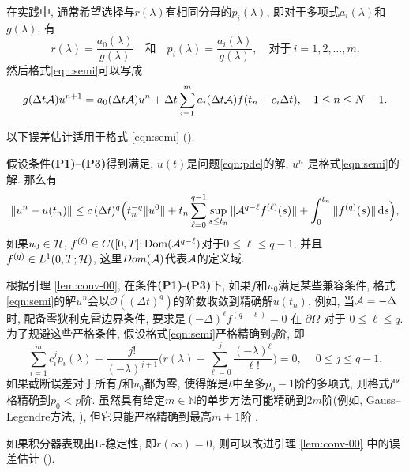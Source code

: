 在实践中, 通常希望选择与$r (\lambda)$有相同分母的$p_i(\lambda)$, 即对于多项式$a_i(\lambda)$和$g(\lambda)$, 有
\begin{equation*}
	r (\lambda) = \frac{a_0(\lambda)}{g(\lambda)}\quad \text{和} \quad p_i(\lambda) = \frac{a_i(\lambda)}{g(\lambda)}, \quad \text{对于}~i=1,2,\ldots,m.
\end{equation*}
然后格式\eqref{eqn:semi}可以写成
\begin{equation*}
	g({\Delta t} {\mathcal{A}}) u^{n+1} = a_0({\Delta t} {\mathcal{A}}) u^{n} + {\Delta t} \sum_{i=1}^m a_i({\Delta t} {\mathcal{A}}) f(t_n+c_i\Delta t) ,\quad 1 \le n\le N-1.
\end{equation*}

以下误差估计适用于格式 \eqref{eqn:semi} (\cite[定理7.2和8.1]{thomee2007galerkin}). 
\begin{lemma}\label{lem:conv-00}
	假设条件{\bf{(P1)}}--{\bf{(P3)}}得到满足, 
	$u(t)$是问题\eqref{eqn:pde}的解, $u^n$
	是格式\eqref{eqn:semi}的解. 那么有
	\begin{equation*}%
		\|u^n - u(t_n)\|\leq
		c\, (\Delta t)^q \Big( t_n^{-q} \| u^0 \|
		+ t_n \sum_{\ell=0}^{q-1} \sup_{s\le t_n} \| \A^{q-\ell}f^{(\ell)}(s)  \| + \int_0^{t_n}
		\| f^{(q)}(s) \|\,\d s\Big),
	\end{equation*}
	如果$u_0\in {\mathcal{H}}$, $f^{(\ell)}\in C([0,T];\mathrm{Dom}({\mathcal{A}}^{q-\ell})$对于$0\le \ell\le q-1$, 并且$f^{(q)} \in L^1(0,T; {\mathcal{H}})$, 这里$Dom({\mathcal{A}})$代表${\mathcal{A}}$的定义域.
\end{lemma}\medskip

 \begin{remark}\label{rem:conv-00}
	根据引理 \ref{lem:conv-00}, 在条件{\bf{(P1)}}-{\bf{(P3)}}下, 如果$f$和$u_0$满足某些兼容条件, 格式\eqref{eqn:semi}的解$u^n$会以$\mathcal{O}((\Delta t)^q)$的阶数收敛到精确解$u(t_n)$. 例如, 当\({\mathcal{A}} = -\Delta\)时, 配备零狄利克雷边界条件, 要求是\( (-\Delta)^{\ell} f^{(q-\ell)} = 0 \) 在 \(\partial\Omega\) 对于 \(0 \le \ell \le q\). 为了规避这些严格条件, 假设格式\eqref{eqn:semi}严格精确到$q$阶, 即
	\[
	\sum_{i=1}^m c_i^j p_i(\lambda) - \frac{j!}{(-\lambda)^{j+1}}\Big( r (\lambda)
	- \sum_{\ell=0}^j \frac{(-\lambda)^\ell}{\ell!}\Big) = 0, \quad ~0\le j\le q-1.
	\]
	如果截断误差对于所有$f$和$u_0$都为零, 使得解是$t$中至多$p_0-1$阶的多项式, 则格式严格精确到$p_0 < p$阶. 
	虽然具有给定$m \in \mathbb{N}$的单步方法可能精确到$2m$阶(例如, Gauss--Legendre方法, \cite[第2.2节]{ehle1969pade}), 但它只能严格精确到最高\(m+1\)阶 \cite[引理5]{brenner1982single}. 
\end{remark}\medskip

\begin{remark}\label{rem:conv-01}
	如果积分器表现出L-稳定性, 即$r(\infty) = 0$, 则可以改进引理 \ref{lem:conv-00} 中的误差估计 (\cite[定理7.2]{thomee2007galerkin}). 
\end{remark}

